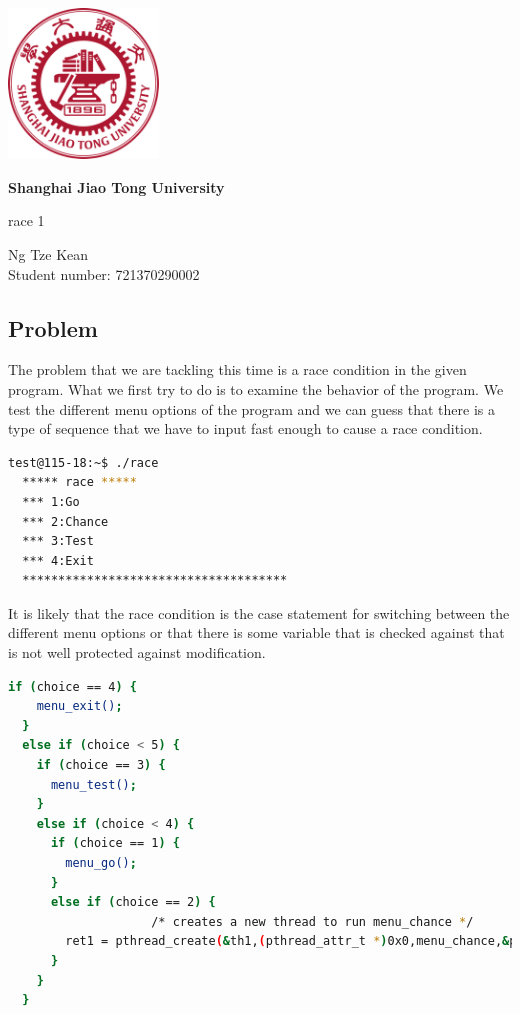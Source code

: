\documentclass{article}
\begin{document}
\begin{titlepage}
  \begin{center}
    \vfill

    \includegraphics[width=4cm]{sjtu.png}

    \vspace{1cm}

    \textbf{\huge Shanghai Jiao Tong University}

    \vspace{0.5cm}

    {\large race 1}

    \vspace{1.5cm}

    Ng Tze Kean\\Student number: 721370290002

  \end{center}
\end{titlepage}

\subsection*{Problem}

The problem that we are tackling this time is a race condition in the given
program. What we first try to do is to examine the behavior of the program. We
test the different menu options of the program and we can guess that there is a
type of sequence that we have to input fast enough to cause a race condition.

\begin{lstlisting}[language=bash]
  test@115-18:~$ ./race
  ***** race *****
  *** 1:Go
  *** 2:Chance
  *** 3:Test
  *** 4:Exit 
  *************************************
\end{lstlisting}

It is likely that the race condition is the case statement for switching
between the different menu options or that there is some variable that is
checked against that is not well protected against modification.

\begin{lstlisting}[language=bash]
  if (choice == 4) {
    menu_exit();
  }
  else if (choice < 5) {
    if (choice == 3) {
      menu_test();
    }
    else if (choice < 4) {
      if (choice == 1) {
        menu_go();
      }
      else if (choice == 2) {
                    /* creates a new thread to run menu_chance */
        ret1 = pthread_create(&th1,(pthread_attr_t *)0x0,menu_chance,&pstr1);
      }
    }
  }
\end{lstlisting}
\end{document}
